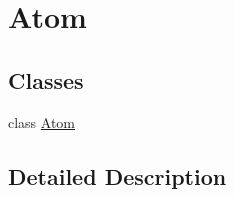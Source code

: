 \hypertarget{group___atom}{}\section{Atom}
\label{group___atom}
\subsection*{Classes}
\begin{DoxyCompactItemize}
\item 
class \mbox{\hyperlink{class_atom}{Atom}}
\end{DoxyCompactItemize}


\subsection{Detailed Description}
